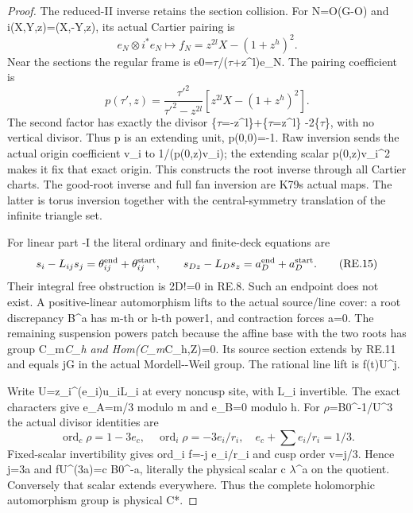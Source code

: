 \begin{proof}
The reduced-II inverse retains the section collision. For N=O(G\textquotesingle-O\textquotesingle)
and i(X,Y,z)=(X,-Y,z), its actual Cartier pairing is
\[
e_N\otimes i^*e_N\longmapsto f_N=z^{2l}X-(1+z^h)^2.
\tag{RE.13}
\]
Near the sections the regular frame is e0=\(\tau\)\textquotesingle/(\(\tau\)\textquotesingle+z\^{}l)e\_N.
The pairing coefficient is
\[
p(\tau',z)=\frac{\tau'^2}{\tau'^2-z^{2l}}
                 [z^{2l}X-(1+z^h)^2].\tag{RE.14}
\]
The second factor has exactly the divisor \{\(\tau\)\textquotesingle=-z\^{}l\}+\{\(\tau\)\textquotesingle=z\^{}l\}
-2\{\(\tau\)\}, with no vertical divisor. Thus p is an extending unit,
p(0,0)=-1. Raw inversion sends the actual origin coefficient v\_i to
1/(p(0,z)v\_i); the extending scalar p(0,z)v\_i\^{}2 makes it fix that
exact origin. This constructs the root inverse through all Cartier
charts. The good-root inverse and full fan inversion are K79\textquotesingle s actual
maps. The latter is torus inversion together with the central-symmetry
translation of the infinite triangle set.

For linear part -I the literal ordinary and finite-deck equations are
\[
s_i-L_{ij}s_j=\theta^{\rm end}_{ij}+\theta^{\rm start}_{ij},\qquad
s_{Dz}-L_Ds_z=a_D^{\rm end}+a_D^{\rm start}.\tag{RE.15}
\]
Their integral free obstruction is 2D!=0 in RE.8. Such an endpoint does
not exist. A positive-linear automorphism lifts to the actual source/line
cover: a root discrepancy B\^{}a has m-th or h-th power1, and contraction
forces a=0. The remaining suspension powers patch because the affine
base with the two roots has group C\_m\emph{C\_h and Hom(C\_m}C\_h,Z)=0.
Its source section extends by RE.11 and equals jG in the actual
Mordell-\/-Weil group. The rational line lift is f(t)U\^{}j.

Write U=z\_i\^{}(e\_i)u\_iL\_i at every noncusp site, with L\_i invertible.
The exact characters give e\_A=m/3 modulo m and e\_B=0 modulo h.
For \(\rho\)=B0\^{}-1/U\^{}3 the actual divisor identities are
\[
\operatorname{ord}_c\rho=1-3e_c,\quad
\operatorname{ord}_i\rho=-3e_i/r_i,\quad
                         e_c+\sum e_i/r_i=1/3.\tag{RE.16}
\]
Fixed-scalar invertibility gives ord\_i f=-j e\_i/r\_i and cusp order
v=j/3. Hence j=3a and fU\^{}(3a)=c B0\^{}-a, literally the physical scalar
c \(\lambda\)\^{}a on the quotient. Conversely that scalar extends everywhere.
Thus the complete holomorphic automorphism group is physical C*.


\end{proof}
